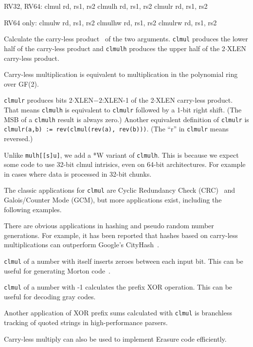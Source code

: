 \begin{rvb}
  RV32, RV64:
    clmul  rd, rs1, rs2
    clmulh rd, rs1, rs2
    clmulr rd, rs1, rs2

  RV64 only:
    clmulw  rd, rs1, rs2
    clmulhw rd, rs1, rs2
    clmulrw rd, rs1, rs2
\end{rvb}

Calculate the carry-less product~\cite{CarryLessProduct} of the two arguments. \texttt{clmul}
produces the lower half of the carry-less product and \texttt{clmulh} produces the upper half
of the 2$\cdot$XLEN carry-less product.

Carry-less multiplication is equivalent to multiplication in the polynomial ring over GF(2).

\texttt{clmulr} produces bits 2$\cdot$XLEN$-2$:XLEN-1 of the 2$\cdot$XLEN carry-less product.
That means \texttt{clmulh} is equivalent to \texttt{clmulr} followed by a 1-bit right shift.
(The MSB of a \texttt{clmulh} result is always zero.) Another equivalent definition of
\texttt{clmulr} is \texttt{clmulr(a,b) := rev(clmul(rev(a), rev(b)))}. (The ``r''
in \texttt{clmulr} means reversed.)

Unlike {\tt mulh[[s]u]}, we add a *W variant of {\tt clmulh}. This is because we expect
some code to use 32-bit clmul intrisics, even on 64-bit architectures. For example in cases
where data is processed in 32-bit chunks.



The classic applications for \texttt{clmul} are Cyclic Redundancy Check (CRC)~\cite{FastCRC,Wolf18A}
and Galois/Counter Mode (GCM), but more applications exist, including the following examples.

There are obvious applications in hashing and pseudo random number generations. For
example, it has been reported that hashes based on carry-less multiplications can
outperform Google's CityHash~\cite{CLHASH}.

\texttt{clmul} of a number with itself inserts zeroes between each input bit. This can
be useful for generating Morton code~\cite{MortonCode}.

\texttt{clmul} of a number with -1 calculates the prefix XOR operation. This can
be useful for decoding gray codes.

Another application of XOR prefix sums calculated with \texttt{clmul} is
branchless tracking of quoted strings in high-performance parsers.~\cite{ParseJSON}

Carry-less multiply can also be used to implement Erasure code efficiently.~\cite{ClmulErasureCode}

